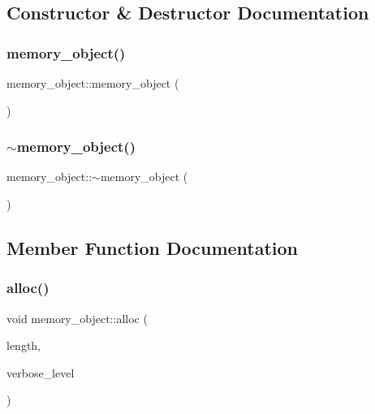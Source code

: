 \subsection{Constructor \& Destructor Documentation}
\mbox{\label{classmemory__object_a5465c06078f383cff3a663212db3385a}} 
\subsubsection{\texorpdfstring{memory\+\_\+object()}{memory\_object()}}
{\footnotesize\ttfamily memory\+\_\+object\+::memory\+\_\+object (\begin{DoxyParamCaption}{ }\end{DoxyParamCaption})}

\mbox{\label{classmemory__object_a9af084044507354ba7fcc5f28220a3a4}} 
\subsubsection{\texorpdfstring{$\sim$memory\+\_\+object()}{~memory\_object()}}
{\footnotesize\ttfamily memory\+\_\+object\+::$\sim$memory\+\_\+object (\begin{DoxyParamCaption}{ }\end{DoxyParamCaption})}



\subsection{Member Function Documentation}
\mbox{\label{classmemory__object_a0768d510d8df4bed863435b637750185}} 
\subsubsection{\texorpdfstring{alloc()}{alloc()}}
{\footnotesize\ttfamily void memory\+\_\+object\+::alloc (\begin{DoxyParamCaption}\item[{\mbox{\hyperlink{galois_8h_a09fddde158a3a20bd2dcadb609de11dc}{I\+NT}}}]{length,  }\item[{\mbox{\hyperlink{galois_8h_a09fddde158a3a20bd2dcadb609de11dc}{I\+NT}}}]{verbose\+\_\+level }\end{DoxyParamCaption})}

